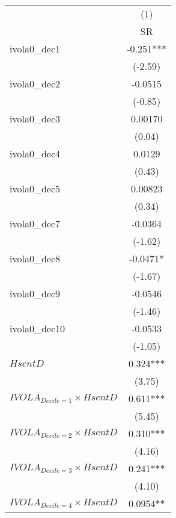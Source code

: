 \begin{tabular}{ll}
        &  \\
\midrule
        & \multicolumn{1}{c}{(1)} \\
        & \multicolumn{1}{c}{SR} \\
\midrule
ivola0_dec1 & \multicolumn{1}{c}{-0.251***} \\
        & \multicolumn{1}{c}{(-2.59)} \\
ivola0_dec2 & \multicolumn{1}{c}{-0.0515} \\
        & \multicolumn{1}{c}{(-0.85)} \\
ivola0_dec3 & \multicolumn{1}{c}{0.00170} \\
        & \multicolumn{1}{c}{(0.04)} \\
ivola0_dec4 & \multicolumn{1}{c}{0.0129} \\
        & \multicolumn{1}{c}{(0.43)} \\
ivola0_dec5 & \multicolumn{1}{c}{0.00823} \\
        & \multicolumn{1}{c}{(0.34)} \\
ivola0_dec7 & \multicolumn{1}{c}{-0.0364} \\
        & \multicolumn{1}{c}{(-1.62)} \\
ivola0_dec8 & \multicolumn{1}{c}{-0.0471*} \\
        & \multicolumn{1}{c}{(-1.67)} \\
ivola0_dec9 & \multicolumn{1}{c}{-0.0546} \\
        & \multicolumn{1}{c}{(-1.46)} \\
ivola0_dec10 & \multicolumn{1}{c}{-0.0533} \\
        & \multicolumn{1}{c}{(-1.05)} \\
$HsentD$ & \multicolumn{1}{c}{0.324***} \\
        & \multicolumn{1}{c}{(3.75)} \\
$IVOLA_{Decile = 1} \times HsentD$ & \multicolumn{1}{c}{0.611***} \\
        & \multicolumn{1}{c}{(5.45)} \\
$IVOLA_{Decile = 2} \times HsentD$ & \multicolumn{1}{c}{0.310***} \\
        & \multicolumn{1}{c}{(4.16)} \\
$IVOLA_{Decile = 3} \times HsentD$ & \multicolumn{1}{c}{0.241***} \\
        & \multicolumn{1}{c}{(4.10)} \\
$IVOLA_{Decile = 4} \times HsentD$ & \multicolumn{1}{c}{0.0954**} \\

\end{tabular}
